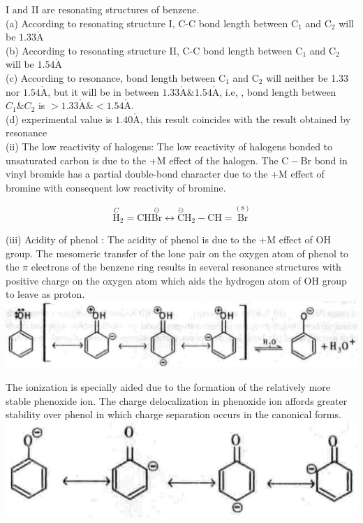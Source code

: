 \documentclass[10pt]{article}
\def\AA{\mathring{\mathrm{A}}}
\begin{document}
I and II are resonating structures of benzene.\\
(a) According to resonating structure I, C-C bond length between $\mathrm{C}_{1}$ and $\mathrm{C}_{2}$ will be $1.33 \AA$\\
(b) According to resonating structure II, C-C bond length between $\mathrm{C}_{1}$ and $\mathrm{C}_{2}$ will be $1.54 \AA$\\
(c) According to resonance, bond length between $\mathrm{C}_{1}$ and $\mathrm{C}_{2}$ will neither be 1.33 nor $1.54 \AA$, but it will be in between $1.33 \AA \& 1.54 \AA$, i.e, , bond length between $C_{1} \& C_{2}$ is $>1.33 \AA \&<1.54 \AA$.\\
(d) experimental value is $1.40 \AA$, this result coincides with the result obtained by resonance\\
(ii) The low reactivity of halogens: The low reactivity of halogens bonded to unsaturated carbon is due to the +M effect of the halogen. The $\mathrm{C}-\mathrm{Br}$ bond in vinyl bromide has a partial double-bond character due to the +M effect of bromine with consequent low reactivity of bromine.

$$
\stackrel{C}{\mathrm{H}}_{2}=\mathrm{CH} \stackrel{\ominus}{\mathrm{Br}} \longleftrightarrow \stackrel{\ominus}{\mathrm{C}} \mathrm{H}_{2}-\mathrm{CH}=\stackrel{(8)}{\mathrm{Br}}
$$

(iii) Acidity of phenol : The acidity of phenol is due to the +M effect of OH group. The mesomeric transfer of the lone pair on the oxygen atom of phenol to the $\pi$ electrons of the benzene ring results in several resonance structures with positive charge on the oxygen atom which aids the hydrogen atom of OH group to leave as proton.\\
\includegraphics[max width=\textwidth, center]{2025_01_28_8470952b98110cec3aabg-074(1)}

The ionization is specially aided due to the formation of the relatively more stable phenoxide ion. The charge delocalization in phenoxide ion affords greater stability over phenol in which charge separation occurs in the canonical forms.\\
\includegraphics[max width=\textwidth, center]{2025_01_28_8470952b98110cec3aabg-074}
\end{document}
